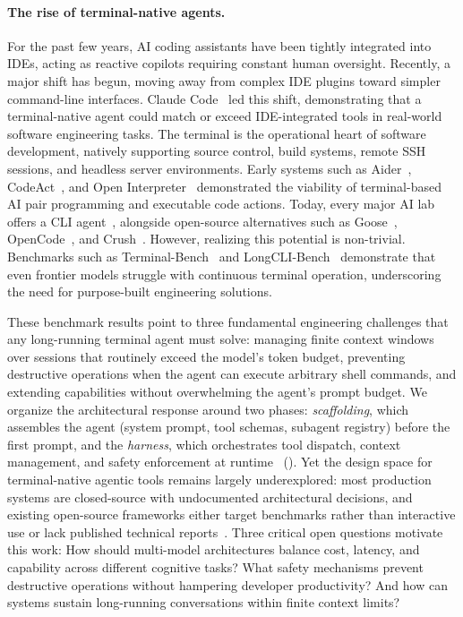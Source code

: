 \paragraph{The rise of terminal-native agents.} For the past few years, AI coding assistants have been tightly integrated into IDEs, acting as reactive copilots requiring constant human oversight. Recently, a major shift has begun, moving away from complex IDE plugins toward simpler command-line interfaces. Claude Code~\cite{anthropic2025claudecode} led this shift, demonstrating that a terminal-native agent could match or exceed IDE-integrated tools in real-world software engineering tasks. The terminal is the operational heart of software development, natively supporting source control, build systems, remote SSH sessions, and headless server environments. Early systems such as Aider~\cite{aider2024}, CodeAct~\cite{wang2024codeact}, and Open Interpreter~\cite{openInterpreter} demonstrated the viability of terminal-based AI pair programming and executable code actions. Today, every major AI lab offers a CLI agent~\cite{anthropic2025claudecode, google2025geminicli, openai2025codex}, alongside open-source alternatives such as Goose~\cite{block2025goose}, OpenCode~\cite{opencode2025}, and Crush~\cite{charmbracelet2025crush}. However, realizing this potential is non-trivial. Benchmarks such as Terminal-Bench~\cite{terminal_bench} and LongCLI-Bench~\cite{longcli_bench} demonstrate that even frontier models struggle with continuous terminal operation, underscoring the need for purpose-built engineering solutions.

These benchmark results point to three fundamental engineering challenges that any long-running terminal agent must solve: managing finite context windows over sessions that routinely exceed the model's token budget, preventing destructive operations when the agent can execute arbitrary shell commands, and extending capabilities without overwhelming the agent's prompt budget. We organize the architectural response around two phases: \emph{scaffolding}, which assembles the agent (system prompt, tool schemas, subagent registry) before the first prompt, and the \emph{harness}, which orchestrates tool dispatch, context management, and safety enforcement at runtime~\cite{anthropic2025harness} (). Yet the design space for terminal-native agentic tools remains largely underexplored: most production systems are closed-source with undocumented architectural decisions, and existing open-source frameworks either target benchmarks rather than interactive use or lack published technical reports~\cite{mei2025survey, hua2025context}. Three critical open questions motivate this work: How should multi-model architectures balance cost, latency, and capability across different cognitive tasks? What safety mechanisms prevent destructive operations without hampering developer productivity? And how can systems sustain long-running conversations within finite context limits?

